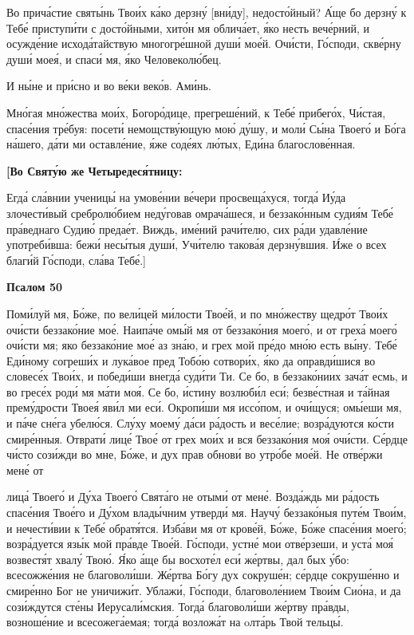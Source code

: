    Во прича́стие святы́нь Твои́х ка́ко дерзну́ [вни́ду], недосто́йный? А́ще бо
дерзну́ к Тебе́ приступи́ти с досто́йными, хито́н мя облича́ет, я́ко несть
вече́рний, и осужде́ние исхода́тайствую многогре́шной души́ мое́й. Очи́сти,
Го́споди, скве́рну души́ моея́, и спаси́ мя, я́ко Человеколю́бец.


   И ны́не и при́сно и во ве́ки веко́в. Ами́нь.


   Мно́гая мно́жества мои́х, Богоро́дице, прегреше́ний, к Тебе́ прибего́х,
Чи́стая, спасе́ния тре́буя: посети́ немощству́ющую мою́ ду́шу, и моли́ Сы́на
Твоего́ и Бо́га на́шего, да́ти ми оставле́ние, я́же соде́ях лю́тых, Еди́на
благослове́нная.



 

\bfseries [Во Святу́ю же Четыредеся́тницу:\normalfont{}


   Егда́ сла́внии ученицы́ на умове́нии ве́чери просвеща́хуся, тогда́ Иу́да
злочести́вый сребролю́бием неду́говав омрача́шеся, и беззако́нным судия́м
Тебе́ пра́веднаго Судию́ предае́т. Виждь, име́ний рачи́телю, сих ра́ди
удавле́ние употреби́вша: бежи́ несы́тыя души́, Учи́телю такова́я дерзну́вшия.
И́же о всех благи́й Го́споди, сла́ва Тебе́.]



 

\bfseries Псалом 50\normalfont{}


   Поми́луй мя, Бо́же, по вели́цей ми́лости Твое́й, и по мно́жеству щедро́т
Твои́х очи́сти беззако́ние мое́. Наипа́че омы́й мя от беззако́ния моего́, и от
греха́ моего́ очи́сти мя; яко беззако́ние мое́ аз зна́ю, и грех мой пре́до мно́ю
есть вы́ну. Тебе́ Еди́ному согреши́х и лука́вое пред Тобо́ю сотвори́х, я́ко да
оправди́шися во словесе́х Твои́х, и победи́ши внегда́ суди́ти Ти. Се бо, в
беззако́ниих зача́т есмь, и во гресе́х роди́ мя ма́ти моя́. Се бо, и́стину
возлюби́л еси́; безве́стная и та́йная прему́дрости Твоея́ яви́л ми еси́.
Окропи́ши мя иссо́пом, и очи́щуся; омы́еши мя, и па́че сне́га убелю́ся. Слу́ху
моему́ да́си ра́дость и весе́лие; возра́дуются ко́сти смире́нныя. Отврати́ лице́
Твое́ от грех мои́х и вся беззако́ния моя́ очи́сти. Се́рдце чи́сто сози́жди во
мне, Бо́же, и дух прав обнови́ во утро́бе мое́й. Не отве́ржи мене́ от

лица́ Твоего́ и Ду́ха Твоего́ Свята́го не отыми́ от мене́. Возда́ждь ми
ра́дость спасе́ния Твое́го и Ду́хом влады́чним утверди́ мя. Научу́
беззако́ныя путе́м Твои́м, и нечести́вии к Тебе́ обратя́тся. Изба́ви мя от
крове́й, Бо́же, Бо́же спасе́ния моего́; возра́дуется язы́к мой пра́вде
Твое́й. Го́споди, устне́ мои отве́рзеши, и уста́ моя́ возвестя́т хвалу́
Твою́. Я́ко а́ще бы восхоте́л еси́ же́ртвы, дал бых у́бо: всесожже́ния не
благоволи́ши. Же́ртва Бо́гу дух сокруше́н; се́рдце сокруше́нно и смире́нно
Бог не уничижи́т. Ублажи́, Го́споди, благоволе́нием Твои́м Сио́на, и
да сози́ждутся сте́ны Иерусали́мския. Тогда́ благоволи́ши же́ртву
пра́вды, возноше́ние и всесожега́емая; тогда́ возложа́т на oлта́рь Твой
тельцы́.



